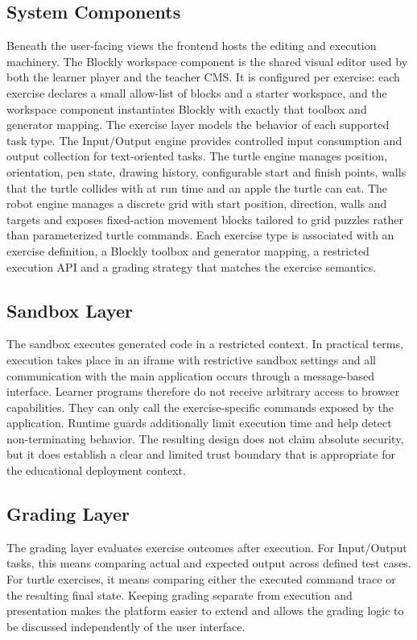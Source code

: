 \subsection*{System Components}
Beneath the user-facing views the frontend hosts the editing and execution machinery.
The Blockly workspace component is the shared visual editor used by both the learner player and the teacher CMS. It is configured per exercise: each exercise
declares a small allow-list of blocks and a starter workspace, and the workspace component instantiates Blockly with exactly that toolbox and generator mapping.
The exercise layer models the behavior of each supported task type.
The Input/Output engine provides controlled input consumption and output collection for text-oriented tasks.
The turtle engine manages position, orientation, pen state, drawing history, configurable start and finish points, walls that the turtle collides with
at run time and an apple the turtle can eat.
The robot engine manages a discrete grid with start position, direction, walls and targets and exposes fixed-action movement blocks tailored to grid puzzles
rather than parameterized turtle commands. Each exercise type is associated with an exercise definition, a Blockly toolbox and generator mapping, a restricted execution
API and a grading strategy that matches the exercise semantics.


\subsection{Sandbox Layer}
The sandbox executes generated code in a restricted context.
In practical terms, execution takes place in an iframe with restrictive sandbox settings and all communication with the main application
occurs through a message-based interface. Learner programs therefore do not receive arbitrary access to browser capabilities. They can
only call the exercise-specific commands exposed by the application.
Runtime guards additionally limit execution time and help detect non-terminating behavior. The resulting design does not claim absolute security, but
it does establish a clear and limited trust boundary that is appropriate for the educational deployment context.


\subsection{Grading Layer}
The grading layer evaluates exercise outcomes after execution.
For Input/Output tasks, this means comparing actual and expected output across defined test cases.
For turtle exercises, it means comparing either the executed command trace or the resulting final state.
Keeping grading separate from execution and presentation makes the platform easier to extend and allows the grading logic to be
discussed independently of the user interface.

